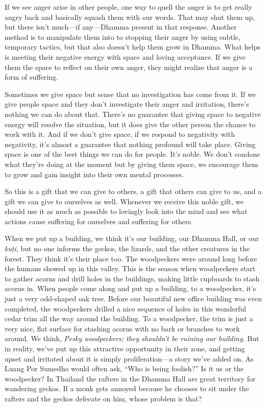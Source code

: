 If we see anger arise in other people, one way to quell the anger is to 
get really angry back and basically squash them with our words. That 
may shut them up, but there isn't much---if any---Dhamma present in 
that response. Another method is to manipulate them into to stopping 
their anger by using subtle, temporary tactics, but that also doesn't 
help them grow in Dhamma. What helps is meeting their negative energy 
with space and loving acceptance. If we give them the space to reflect 
on their own anger, they might realize that anger is a form of 
suffering.

Sometimes we give space but sense that no investigation has come from 
it. If we give people space and they don't investigate their anger and 
irritation, there's nothing we can do about that. There's no guarantee 
that giving space to negative energy will resolve the situation, but it 
does give the other person the chance to work with it. And if we don't 
give space, if we respond to negativity with negativity, it's almost a 
guarantee that nothing profound will take place. Giving space is one of 
the best things we can do for people. It's noble. We don't condone what 
they're doing at the moment but by giving them space, we encourage them 
to grow and gain insight into their own mental processes.

So this is a gift that we can give to others, a gift that others can 
give to us, and a gift we can give to ourselves as well. Whenever we 
receive this noble gift, we should use it as much as possible to 
lovingly look into the mind and see what actions cause suffering for 
ourselves and suffering for others.


When we put up a building, we think it's our building, our Dhamma Hall, 
or our \emph{kuṭi}, but no one informs the geckos, the lizards, and 
the other creatures in the forest. They think it's their place too. The 
woodpeckers were around long before the humans showed up in this 
valley. This is the season when woodpeckers start to gather acorns and 
drill holes in the buildings, making little cupboards to stash acorns 
in. When people come along and put up a building, to a woodpecker, it's 
just a very odd-shaped oak tree. Before our beautiful new office 
building was even completed, the woodpeckers drilled a nice sequence of 
holes in this wonderful cedar trim all the way around the building. To 
a woodpecker, the trim is just a very nice, flat surface for stashing 
acorns with no bark or branches to work around. We think, \emph{Pesky 
woodpeckers; they shouldn't be ruining our building.} But in reality, 
we've put up this attractive opportunity in their zone, and getting 
upset and irritated about it is simply proliferation---a story we've 
added on. As Luang Por Sumedho would often ask, ``Who is being 
foolish?'' Is it us or the woodpecker? In Thailand the rafters in the 
Dhamma Hall are great territory for wandering geckos. If a monk gets 
annoyed because he chooses to sit under the rafters and the geckos 
defecate on him, whose problem is that?

